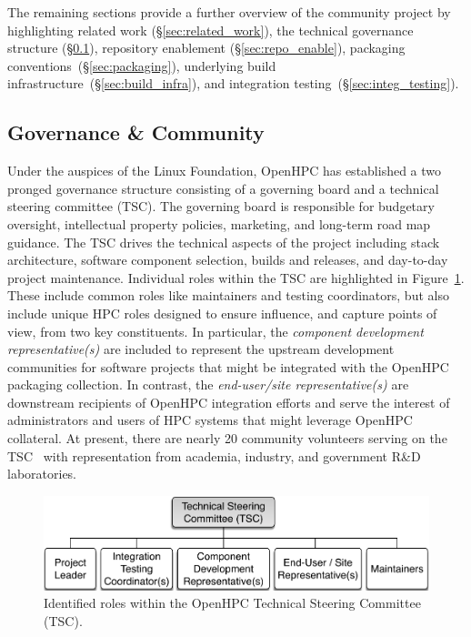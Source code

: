 \documentclass{sig-alternate-05-2015}
\begin{document}
The remaining sections provide a further overview of the community project
by highlighting related work (\S\ref{sec:related_work}), the technical governance
structure (\S\ref{sec:governance}), repository enablement (\S\ref{sec:repo_enable}), packaging
conventions~(\S\ref{sec:packaging}), underlying build
infrastructure~(\S\ref{sec:build_infra}), and integration testing~(\S\ref{sec:integ_testing}).



\newpage
\subsection{Governance \& Community} \label{sec:governance}
Under the auspices of the Linux Foundation, OpenHPC has established a two
pronged governance structure consisting of a governing board and a technical
steering committee (TSC). The governing board is responsible for budgetary
oversight, intellectual property policies, marketing, and long-term road map
guidance. The TSC drives the technical aspects of the project including stack
architecture, software component selection, builds and releases, and day-to-day
project maintenance. Individual roles within the TSC are highlighted in
Figure~\ref{fig:tsc_governance}.  These include common roles like maintainers
and testing coordinators, but also include unique HPC roles designed to ensure
influence, and capture points of view, from two key constituents. In particular,
the {\em component development representative(s)} are included to represent the
upstream development communities for software projects that might be integrated
with the OpenHPC packaging collection. In contrast, the {\em end-user/site
  representative(s)} are downstream recipients of OpenHPC integration efforts
and serve the interest of administrators and users of HPC systems that might leverage
OpenHPC collateral.  At present, there are nearly 20 community volunteers
serving on the TSC~\cite{TSC_url} with representation from academia, industry,
and government R\&D laboratories.


\begin{figure}
  \includegraphics[width=1.0\linewidth]{figures/governance}
  \caption{Identified roles within the OpenHPC Technical Steering Committee (TSC).}
  \label{fig:tsc_governance}
\end{figure}
\end{document}
